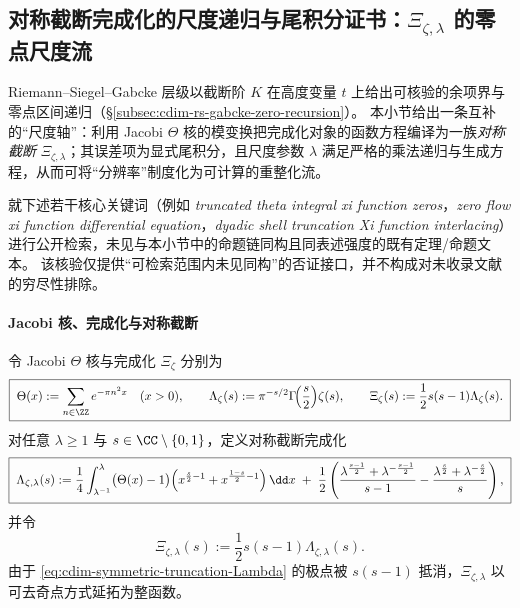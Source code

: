 \subsection{对称截断完成化的尺度递归与尾积分证书：\texorpdfstring{$\Xi_{\zeta,\lambda}$}{Xi(zeta,lambda)} 的零点尺度流}\label{subsec:cdim-symmetric-truncation-scale-flow}
Riemann--Siegel--Gabcke 层级以截断阶 \(K\) 在高度变量 \(t\) 上给出可核验的余项界与零点区间递归（\S\ref{subsec:cdim-rs-gabcke-zero-recursion}）。
本小节给出一条互补的“尺度轴”：利用 Jacobi \(\Theta\) 核的模变换把完成化对象的函数方程编译为一族\emph{对称截断} \(\Xi_{\zeta,\lambda}\)；其误差项为显式尾积分，且尺度参数 \(\lambda\) 满足严格的乘法递归与生成方程，从而可将“分辨率”制度化为可计算的重整化流。

\begin{remark}[可检索范围内的独立性说明]\label{rem:cdim-symmetric-truncation-search-independence}
就下述若干核心关键词（例如 \emph{truncated theta integral xi function zeros}，\emph{zero flow xi function differential equation}，\emph{dyadic shell truncation Xi function interlacing}）进行公开检索，未见与本小节中的命题链同构且同表述强度的既有定理/命题文本。
该核验仅提供“可检索范围内未见同构”的否证接口，并不构成对未收录文献的穷尽性排除。
\end{remark}

\paragraph{Jacobi 核、完成化与对称截断}
令 Jacobi \(\Theta\) 核与完成化 \(\Xi_\zeta\) 分别为
\begin{equation}\label{eq:cdim-jacobi-theta-and-xi}
\boxed{\;
\Theta(x):=\sum_{n\in\ZZ}e^{-\pi n^2x}\quad(x>0),\qquad
\Lambda_\zeta(s):=\pi^{-s/2}\Gamma\!\Bigl(\frac{s}{2}\Bigr)\zeta(s),\qquad
\Xi_\zeta(s):=\frac12 s(s-1)\Lambda_\zeta(s).\;}
\end{equation}
对任意 \(\lambda\ge 1\) 与 \(s\in\CC\setminus\{0,1\}\)，定义对称截断完成化
\begin{equation}\label{eq:cdim-symmetric-truncation-Lambda}
\boxed{\;
\Lambda_{\zeta,\lambda}(s)
:=\frac14\int_{\lambda^{-1}}^{\lambda}\bigl(\Theta(x)-1\bigr)
\Bigl(x^{\frac{s}{2}-1}+x^{\frac{1-s}{2}-1}\Bigr)\,\dd x
\;+\;\frac12\left(
\frac{\lambda^{\frac{s-1}{2}}+\lambda^{-\frac{s-1}{2}}}{s-1}
-\frac{\lambda^{\frac{s}{2}}+\lambda^{-\frac{s}{2}}}{s}
\right),\;}
\end{equation}
并令
\begin{equation}\label{eq:cdim-symmetric-truncation-Xi}
\boxed{\;
\Xi_{\zeta,\lambda}(s):=\frac12 s(s-1)\Lambda_{\zeta,\lambda}(s).\;}
\end{equation}
由于 \eqref{eq:cdim-symmetric-truncation-Lambda} 的极点被 \(s(s-1)\) 抵消，\(\Xi_{\zeta,\lambda}\) 以可去奇点方式延拓为整函数。

